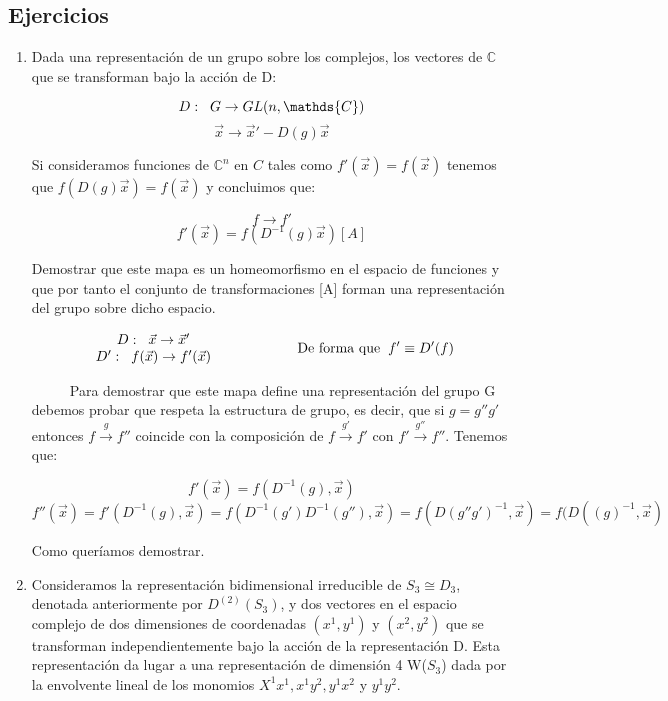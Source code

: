 \documentclass{article}
\begin{document}
\newpage
\subsection{Ejercicios}

\begin{enumerate}
    \item Dada una representación de un grupo sobre los complejos, los vectores de $\mathds{C}$ que se transforman bajo la acción de D:
    
    $$D: \hspace{0.2cm} G \to GL(n,\mathds{C})$$
    $$\Vec{x}\to \Vec{x}'-D(g)\Vec{x}$$
    
    Si consideramos funciones de $\mathds{C}^n$ en $C$ tales como $f'(\Vec{x})=f(\Vec{x})$ tenemos que $f(D(g)\Vec{x})=f(\Vec{x})$ y concluimos que:
    
    $$f\longrightarrow f'$$
    $$f'(\Vec{x})=f(D^{-1}(g)\Vec{x})[A]$$
    
    Demostrar que este mapa es un homeomorfismo en el espacio de funciones y que por tanto el conjunto de transformaciones [A] forman una representación del grupo sobre dicho espacio.
    
    $$\begin{array}{cc}
         D: \hspace{0.2cm} \Vec{x}\to \Vec{x}'  \\
         D': \hspace{0.2cm} f(\Vec{x})\to f'(\Vec{x})
    \end{array} \hspace{2cm} \text{De forma que} \hspace{0.2cm} f'\equiv D'(f)$$
    
    \smallskip
    $\hspace{1cm}$ Para demostrar que este mapa define una representación del grupo G debemos probar que respeta la estructura de grupo, es decir, que si $g=g''g'$ entonces $f\overset{g}{\longrightarrow} f''$ coincide con la composición de $f \overset{g'}{\longrightarrow} f'$ con $f'\overset{g''}{\longrightarrow}f''$. Tenemos que:
    
    $$f'(\Vec{x})=f(D^{-1}(g),\Vec{x})$$
    $$f''(\Vec{x})=f'(D^{-1}(g), \Vec{x})=f(D^{-1}(g')D^{-1}(g''),\Vec{x
    })=f(D(g''g')^{-1},\Vec{x})=f(D((g)^{-1},\Vec{x})$$
    
    Como queríamos demostrar.
    
    \item Consideramos la representación bidimensional irreducible de $S_3 \cong D_3$, denotada anteriormente por $D^{(2)}(S_3)$, y dos vectores en el espacio complejo de dos dimensiones de coordenadas $(x^1,y^1)$ y $(x^2,y^2)$ que se transforman independientemente bajo la acción de la representación D. Esta representación da lugar a una representación de dimensión 4 W($S_3$) dada por la envolvente lineal de los monomios $X^1x^1, x^1y^2,y^1x^2$ y $y^1y^2$. 
    

\end{enumerate}
\end{document}

